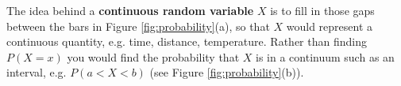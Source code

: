 The idea behind a \textbf{continuous random variable} $X$ is to fill in those
gaps between the bars in Figure \ref{fig:probability}(a), so that $X$ would
represent a continuous quantity, e.g. time, distance, temperature. Rather than
finding $P(X=x)$ you would find the probability that $X$ is in a continuum
such as an interval, e.g. $P(a < X < b)$ (see Figure \ref{fig:probability}(b)).


